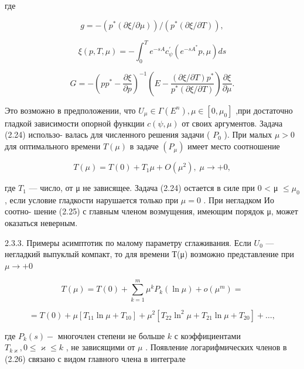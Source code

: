 \documentclass[10pt]{article}
\begin{document}
где

\[
g =  - \left( {{p}^{ * }\left( {\partial \xi /\partial \mu }\right) }\right) /\left( {{p}^{ * }\left( {\partial \xi /\partial T}\right) }\right) ,
\]

\[
\xi \left( {p,T,\mu }\right)  =  - {\int }_{0}^{T}{e}^{-{sA}}{c}_{\psi }^{\prime }\left( {{e}^{-s{A}^{ * }}p,\mu }\right) {ds}
\]

\[
G =  - {\left( p{p}^{ * } - \frac{\partial \xi }{\partial p}\right) }^{-1}\left( {E - \frac{\left( {\partial \xi /\partial T}\right) {p}^{ * }}{{p}^{ * }\left( {\partial \xi /\partial T}\right) }}\right) \frac{\partial \xi }{\partial \mu }.
\]

Это возможно в предположении, что \({U}_{\mu } \in  \Gamma \left( {E}^{n}\right) ,\mu  \in  \left[  {0,{\mu }_{0}}\right]\) ,при достаточно гладкой зависимости опорной функции \(c\left( {\psi ,\mu }\right)\) от своих аргументов. Задача (2.24) использо- валась для численного решения задачи ( \({P}_{0}\) ). При малых \(\mu  > 0\) для оптимального времени \(T\left( \mu \right)\) в задаче \(\left( {P}_{\mu }\right)\) имеет место соотношение

\[
T\left( \mu \right)  = T\left( 0\right)  + {T}_{1}\mu  + O\left( {\mu }^{2}\right) ,\;\mu  \rightarrow   + 0, \tag{2.25}
\]

где \({T}_{1}\) — число, от μ не зависящее. Задача (2.24) остается в силе при 0 < μ \(\leq  {\mu }_{0}\) , если условие гладкости нарушается только при \(\mu  = 0\) . При негладком Ио соотно- шение (2.25) с главным членом возмущения, имеющим порядок μ, может оказаться неверным.

2.3.3. Примеры асимптотик по малому параметру сглаживания. Если \({U}_{0}\) — негладкий выпуклый компакт, то для времени Т(μ) возможно представление при \(\mu  \rightarrow   + 0\)

\[
T\left( \mu \right)  = T\left( 0\right)  + \mathop{\sum }\limits_{{k = 1}}^{m}{\mu }^{k}{P}_{k}\left( {\ln \mu }\right)  + o\left( {\mu }^{m}\right)  =
\]

\[
= T\left( 0\right)  + \mu \left[  {{T}_{11}\ln \mu  + {T}_{10}}\right]   + {\mu }^{2}\left[  {{T}_{22}{\ln }^{2}\mu  + {T}_{21}\ln \mu  + {T}_{20}}\right]   + \ldots , \tag{2.26}
\]

где \({P}_{k}\left( s\right)  -\) многочлен степени не больше \(k\) с коэффициентами \({T}_{k\varkappa },0 \leq  \varkappa  \leq  k\) , не зависящими от \(\mu\) . Появление логарифмических членов в (2.26) связано с видом главного члена в интеграле
\end{document}
